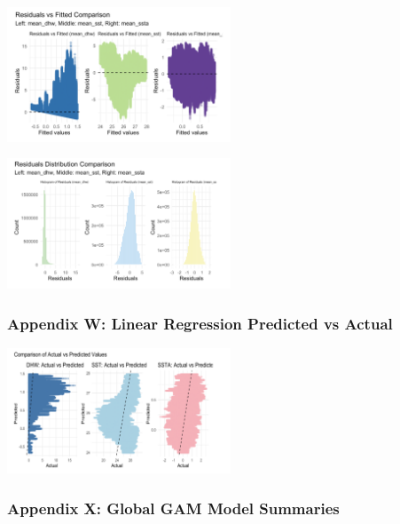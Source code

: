 \documentclass[letterpaper,9pt,twocolumn,twoside,]{pinp}
\begin{document}
\begin{center}
\includegraphics[width=0.5\textwidth]{report_images/lr_resplot.png}
\end{center}

\begin{center}
\includegraphics[width=0.5\textwidth]{report_images/lr_reshist.png}
\end{center}

\subsubsection{Appendix W: Linear Regression Predicted vs
Actual}\label{appendix-w-linear-regression-predicted-vs-actual}

\begin{center}
\includegraphics[width=0.5\textwidth]{report_images/lr_graph.png}
\end{center}

\subsubsection{Appendix X: Global GAM Model
Summaries}\label{appendix-x-global-gam-model-summaries}
\end{document}
